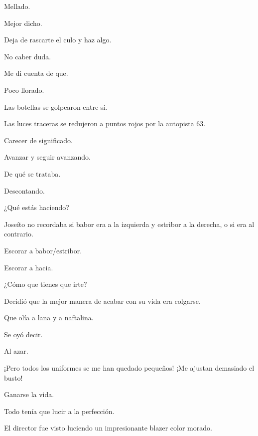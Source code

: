 \sk
Mellado. 

\sk
Mejor dicho. 

\sk
Deja de rascarte el culo y haz algo. 

\sk
No caber duda. 

\sk
Me di cuenta de que. 

\sk
Poco llorado. 

\sk
Las botellas se golpearon entre sí. 

\sk
Las luces traceras se redujeron a puntos rojos por la autopista 63.\nb{}

\sk
Carecer de significado. 

\sk
Avanzar y seguir avanzando. 

\sk
De qué se trataba. 

\sk
Descontando. 

\sk
¿Qué estás haciendo? 

\sk
Joseíto no recordaba si babor era a la izquierda y estribor a la derecha, o si era al contrario. 

\sk
Escorar a babor/estribor. 

\sk
Escorar a hacia. 

\sk
¿Cómo que tienes que irte? 

\sk
Decidió que la mejor manera de acabar con su vida era colgarse. \nb{}

\sk
Que olía a lana y a naftalina. 

\sk
Se oyó decir. 

\sk
Al azar. 

\sk
¡Pero todos los uniformes se me han quedado pequeños! ¡Me ajustan demasiado el busto!\nb{}

\sk
Ganarse la vida. 

\sk
Todo tenía que lucir a la perfección. \nb{}

\sk
El director fue visto luciendo un impresionante blazer color morado. 

